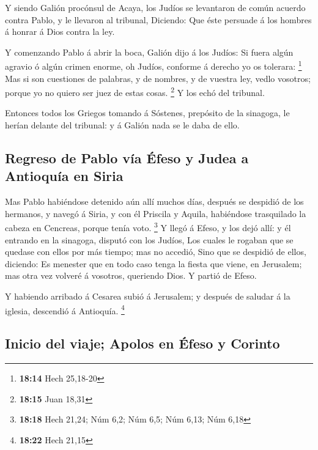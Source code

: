  Y siendo Galión procónsul de Acaya, los Judíos se
levantaron de común acuerdo contra Pablo, y le llevaron al tribunal,
 Diciendo: Que éste persuade á los hombres á honrar á Dios
contra la ley.

 Y comenzando Pablo á abrir la boca, Galión dijo á los
Judíos: Si fuera algún agravio ó algún crimen enorme, oh Judíos,
conforme á derecho yo os tolerara: \footnote{\textbf{18:14} Hech
  25,18-20}  Mas si son cuestiones de palabras, y de
nombres, y de vuestra ley, vedlo vosotros; porque yo no quiero ser juez
de estas cosas. \footnote{\textbf{18:15} Juan 18,31}  Y los
echó del tribunal.

 Entonces todos los Griegos tomando á Sóstenes, prepósito
de la sinagoga, le herían delante del tribunal: y á Galión nada se le
daba de ello.

\hypertarget{regreso-de-pablo-vuxeda-uxe9feso-y-judea-a-antioquuxeda-en-siria}{%
\subsection{Regreso de Pablo vía Éfeso y Judea a Antioquía en
Siria}\label{regreso-de-pablo-vuxeda-uxe9feso-y-judea-a-antioquuxeda-en-siria}}

 Mas Pablo habiéndose detenido aún allí muchos días,
después se despidió de los hermanos, y navegó á Siria, y con él Priscila
y Aquila, habiéndose trasquilado la cabeza en Cencreas, porque tenía
voto. \footnote{\textbf{18:18} Hech 21,24; Núm 6,2; Núm 6,5; Núm 6,13;
  Núm 6,18}  Y llegó á Efeso, y los dejó allí: y él
entrando en la sinagoga, disputó con los Judíos,  Los
cuales le rogaban que se quedase con ellos por más tiempo; mas no
accedió,  Sino que se despidió de ellos, diciendo: Es
menester que en todo caso tenga la fiesta que viene, en Jerusalem; mas
otra vez volveré á vosotros, queriendo Dios. Y partió de Efeso.

 Y habiendo arribado á Cesarea subió á Jerusalem; y después
de saludar á la iglesia, descendió á Antioquía. \footnote{\textbf{18:22}
  Hech 21,15}

\hypertarget{inicio-del-viaje-apolos-en-uxe9feso-y-corinto}{%
\subsection{Inicio del viaje; Apolos en Éfeso y
Corinto}\label{inicio-del-viaje-apolos-en-uxe9feso-y-corinto}}

